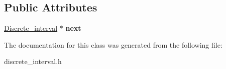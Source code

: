 \subsection*{Public Attributes}
\begin{DoxyCompactItemize}
\item 
\mbox{\label{classDiscrete__interval_a1924b9801f9e248a8e81262388d44a1b}} 
\mbox{\hyperlink{classDiscrete__interval}{Discrete\+\_\+interval}} $\ast$ {\bfseries next}
\end{DoxyCompactItemize}


The documentation for this class was generated from the following file\+:\begin{DoxyCompactItemize}
\item 
discrete\+\_\+interval.\+h\end{DoxyCompactItemize}
